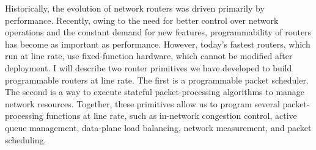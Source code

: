 % 
% 
%

Historically, the evolution of network routers was driven primarily by
performance. Recently, owing to the need for better control over
network operations and the constant demand for new features,
programmability of routers has become as important as performance.
However, today's fastest routers, which run at line rate, use
fixed-function hardware, which cannot be modified after deployment. I
will describe two router primitives we have developed to build
programmable routers at line rate. The first is a programmable packet
scheduler. The second is a way to execute stateful packet-processing
algorithms to manage network resources. Together, these primitives
allow us to program several packet-processing functions at line rate,
such as in-network congestion control, active queue management,
data-plane load balancing, network measurement, and packet scheduling.


